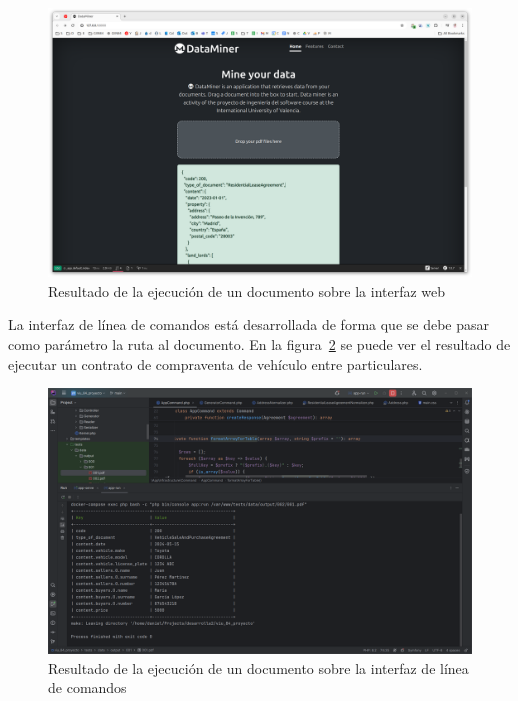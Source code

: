 \begin{figure}[ht]
    \begin{center}
        \includegraphics[width=\textwidth]{./chapter/5/images/chapter_5.1.web_interface}
        \caption{Resultado de la ejecución de un documento sobre la interfaz web}
        \label{fig:chapter_5.1.web_interface}
    \end{center}
\end{figure}

La interfaz de línea de comandos está desarrollada de forma que se debe pasar como parámetro la ruta al documento.
En la figura~\ref{fig:chapter_5.1.cli_interface} se puede ver el resultado de ejecutar un contrato de compraventa de
vehículo entre particulares.

\begin{figure}[ht]
    \begin{center}
        \includegraphics[width=\textwidth]{./chapter/5/images/chapter_5.1.cli_interface}
        \caption{Resultado de la ejecución de un documento sobre la interfaz de línea de comandos}
        \label{fig:chapter_5.1.cli_interface}
    \end{center}
\end{figure}
